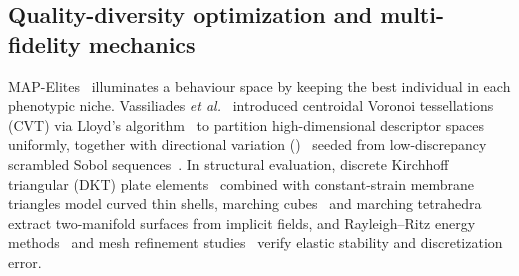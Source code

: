 \subsection{Quality-diversity optimization and multi-fidelity mechanics}
MAP-Elites~\cite{mouret2015} illuminates a behaviour space by keeping the best individual in each phenotypic niche.
Vassiliades \emph{et al.}~\cite{vassiliades2018} introduced centroidal Voronoi tessellations (CVT) via Lloyd's
algorithm~\cite{lloyd1982} to partition high-dimensional descriptor spaces uniformly, together with directional variation
()~\cite{vassiliades2018b} seeded from low-discrepancy scrambled Sobol sequences~\cite{joe2008,matousek1998}.
In structural evaluation, discrete Kirchhoff triangular (DKT) plate elements~\cite{batoz1980} combined with constant-strain
membrane triangles model curved thin shells, marching cubes~\cite{lorensen1987} and marching tetrahedra~\cite{doi1991}
extract two-manifold surfaces from implicit fields, and Rayleigh--Ritz energy methods~\cite{timoshenko1961} and mesh
refinement studies~\cite{roache1998} verify elastic stability and discretization error.
